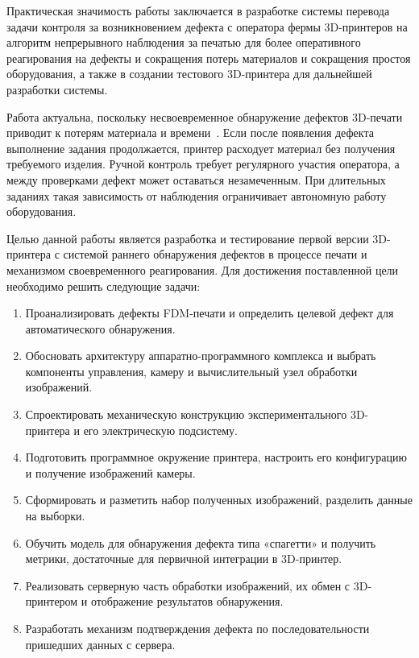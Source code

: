Практическая значимость работы заключается в разработке системы перевода задачи контроля за возникновением дефекта с оператора фермы 3D-принтеров на алгоритм непрерывного наблюдения за печатью для более оперативного реагирования на дефекты и сокращения потерь материалов и сокращения простоя оборудования, а также в создании тестового 3D-принтера для дальнейшей разработки системы.

Работа актуальна, поскольку несвоевременное обнаружение дефектов 3D-печати приводит к потерям материала и времени~\cite{измайлов2020анализ,petsiuk2022towards}. Если после появления дефекта  выполнение задания продолжается, принтер расходует материал без получения требуемого изделия. Ручной контроль требует регулярного участия оператора, а между проверками дефект может оставаться незамеченным. При длительных заданиях такая зависимость от наблюдения ограничивает автономную работу оборудования.

Целью данной работы является разработка и тестирование первой версии 3D-принтера с системой раннего обнаружения дефектов в процессе печати и механизмом своевременного реагирования. Для достижения поставленной цели необходимо решить следующие задачи:
\begin{enumerate}
\item Проанализировать дефекты FDM-печати и определить целевой дефект для автоматического обнаружения.
\item Обосновать архитектуру аппаратно-программного комплекса и выбрать компоненты управления, камеру и вычислительный узел обработки изображений.
\item Спроектировать механическую конструкцию экспериментального 3D-принтера и его электрическую подсистему.
\item Подготовить программное окружение принтера, настроить его конфигурацию и получение изображений камеры.
\item Сформировать и разметить набор полученных изображений, разделить данные на выборки.
\item Обучить модель для обнаружения дефекта типа «спагетти» и получить метрики, достаточные для первичной интеграции в 3D-принтер.
\item Реализовать серверную часть обработки изображений, их обмен с 3D-принтером и отображение результатов обнаружения.
\item Разработать механизм подтверждения дефекта по последовательности пришедших данных с сервера.
\end{enumerate}
